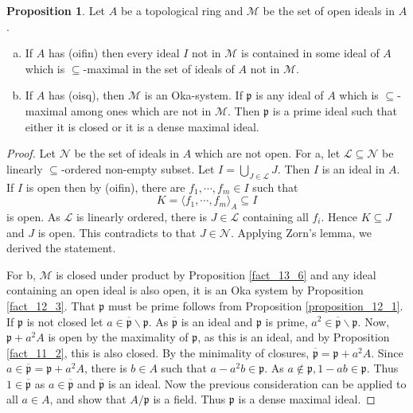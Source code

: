 \documentclass[10pt]{article}
\numberwithin{equation}{section}
\theoremstyle{definition}
\newtheorem{proposition}{Proposition}[subsection]
\newcommand{\p}[0]{\mathfrak{p}}
\begin{document}
\begin{proposition}
\label{proposition_15_5}
Let $A$ be a topological ring and $\mathcal{M}$ be the set of open ideals in $A$.
\begin{enumerate}[a.]
    \item If $A$ has (oifin) then every ideal $I$ not in $\mathcal{M}$ is contained in some ideal of $A$ which is $\subseteq$-maximal in the set of ideals of $A$ not in $\mathcal{M}$.
    \item If $A$ has (oisq), then $\mathcal{M}$ is an Oka-system. If $\p$ is any ideal of $A$ which is $\subseteq$-maximal among ones which are not in $\mathcal{M}$. Then $\p$ is a prime ideal such that either it is closed or it is a dense maximal ideal.
\end{enumerate}
\end{proposition}
\begin{proof}
    Let $\mathcal{N}$ be the set of ideals in $A$ which are not open. For a, let $\mathcal{L}\subseteq\mathcal{N}$ be linearly $\subseteq$-ordered non-empty subset. Let $I = \bigcup_{J\in\mathcal{L}}J$. Then $I$ is an ideal in $A$. If $I$ is open then by (oifin), there are $f_1,\cdots,f_m\in I$ such that
    \begin{equation*}
        K = \langle f_1,\cdots,f_m\rangle_A \subseteq I
    \end{equation*}
    is open. As $\mathcal{L}$ is linearly ordered, there is $J\in\mathcal{L}$ containing all $f_i$. Hence $K\subseteq J$ and $J$ is open. This contradicts to that $J\in\mathcal{N}$. Applying Zorn's lemma, we derived the statement.
    \par For b, $\mathcal{M}$ is closed under product by Proposition \ref{fact_13_6} and any ideal containing an open ideal is also open, it is an Oka system by Proposition \ref{fact_12_3}. That $\p$ must be prime follows from Proposition \ref{proposition_12_1}.
    If $\p$ is not closed let $a\in\overline{\p}\backslash\p$. As $\overline{\p}$ is an ideal and $\p$ is prime, $a^2\in\overline{\p}\backslash\p$. Now, $\p+a^2A$ is open by the maximality of $\p$, as this is an ideal, and by Proposition \ref{fact_11_2}, this is also closed. By the minimality of closures, $\overline{\p} = \p+a^2A$.
    Since $a\in\overline{\p} = \p+a^2A$, there is $b\in A$ such that $a - a^2b\in\p$. As $a\not\in\p, 1 -ab\in \p$. Thus $1\in\overline{\p}$ as $a\in\overline{\p}$ and $\overline{\p}$ is an ideal.
    Now the previous consideration can be applied to all $a\in A$, and show that $A/\p$ is a field. Thus $\p$ is a dense maximal ideal.
\end{proof}
\end{document}
